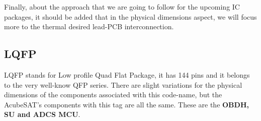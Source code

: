 \documentclass[final]{cubedoc}
\begin{document}
	Finally, about the approach that we are going to follow for the upcoming IC packages, it should be added that in the physical dimensions aspect, we will focus more to the thermal desired lead-PCB interconnection. 
	
	
	\subsection{LQFP}
	
	
	LQFP stands for Low profile Quad Flat Package, it has 144 pins and it belongs to the very well-know QFP series. There are slight variations for the physical dimensions of the components associated with this code-name, but the AcubeSAT's components with this tag are all the same. These are the \textbf{OBDH, SU and ADCS MCU}.
	
\end{document}
